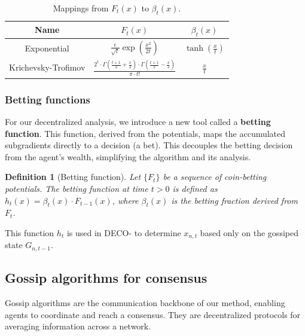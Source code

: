 \documentclass[journal]{IEEEtran} %
\newtheorem{definition}{Definition}
\newcommand{\br}[1]{\left(#1\right)}
\newcommand{\algname}{{DECO}\xspace}
\begin{document}
\begin{table}[H]
    \centering
    \caption{Mappings from $F_t(x)$ to $\beta_t(x)$.}\label{tab:mappings}
    \begin{tabular}{|c|c|c|}
        \hline
        Name                & $F_t(x)$                                                                                                             & $\beta_t(x)$            \\
        \hline
        Exponential         & $\frac{\epsilon}{\sqrt{t}} \exp\br{\frac{x^2}{2t}}$                                                                  & $\tanh\br{\frac{x}{t}}$ \\
        \hline
        Krichevsky-Trofimov & $\frac{2^t \cdot \Gamma\br{\frac{t+1}{2} + \frac{x}{2}} \cdot \Gamma\br{\frac{t+1}{2} - \frac{x}{2}}}{\pi \cdot t!}$ & $\frac{x}{t}$           \\
        \hline
    \end{tabular}
\end{table}

\subsubsection*{Betting functions}
For our decentralized analysis, we introduce a new tool called a \textbf{betting function}.
This function, derived from the potentials, maps the accumulated subgradients directly to a decision (a bet).
This decouples the betting decision from the agent's wealth, simplifying the algorithm and its analysis.

\begin{definition}[Betting function]\label{def:betting-function}
    Let $\{F_t\}$ be a sequence of coin-betting potentials.
    The betting function at time $t > 0$ is defined as $h_t(x) = \beta_t(x) \cdot F_{t-1}(x)$, where $\beta_t(x)$ is the betting fraction derived from $F_t$.
\end{definition}
This function $h_t$ is used in \algname{}- to determine $x_{n,t}$ based only on the gossiped state $G_{n,t-1}$.

\subsection{Gossip algorithms for consensus}\label{subsection:consensus}
Gossip algorithms are the communication backbone of our method, enabling agents to coordinate and reach a consensus.
They are decentralized protocols for averaging information across a network.
\end{document}
